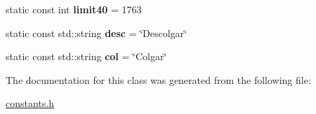 \begin{DoxyCompactItemize}
\item 
\mbox{\label{classconstants_a372b9c082a98ff151deb06ed6d9243f9}} 
static const int {\bfseries limit40} = 1763
\item 
\mbox{\label{classconstants_a789d7d94dd13bfdf2896b09ebe89dc44}} 
static const std\+::string {\bfseries desc} = \char`\"{}Descolgar\char`\"{}
\item 
\mbox{\label{classconstants_afc7df0e44e2fa199057570d1b62ae8ed}} 
static const std\+::string {\bfseries col} = \char`\"{}Colgar\char`\"{}
\end{DoxyCompactItemize}


The documentation for this class was generated from the following file\+:\begin{DoxyCompactItemize}
\item 
\hyperlink{constants_8h}{constants.\+h}\end{DoxyCompactItemize}
